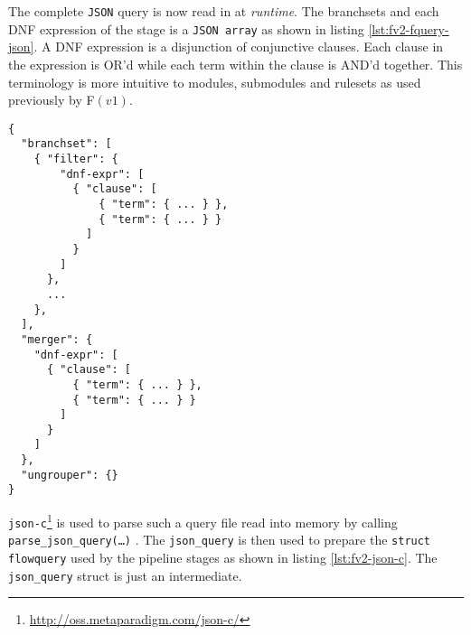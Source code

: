 The complete \texttt{JSON} query is now read in at \emph{runtime}. The
branchsets and each \ac{DNF} expression of the stage is a \texttt{JSON array}
as shown in listing \ref{lst:fv2-fquery-json}. A \ac{DNF} expression is a
disjunction of conjunctive clauses. Each clause in the expression is OR'd
while each term within the clause is AND'd together. This terminology is more
intuitive to modules, submodules and rulesets as used previously by F$(v1)$.

\begin{lstlisting}
{
  "branchset": [
    { "filter": {
        "dnf-expr": [
          { "clause": [
              { "term": { ... } },
              { "term": { ... } }
            ]
          }
        ]
      },
      ...
    },
  ],
  "merger": {
    "dnf-expr": [
      { "clause": [
          { "term": { ... } },
          { "term": { ... } }
        ]
      }
    ]
  },
  "ungrouper": {}
}
\end{lstlisting}

\texttt{json-c}\footnote{\url{http://oss.metaparadigm.com/json-c/}} is used
to parse such a query file read into memory by calling
\texttt{parse\_json\_query(\ldots)} . The
\texttt{json\_query} is then used to prepare the \texttt{struct flowquery}
used by the pipeline stages as shown in listing \ref{lst:fv2-json-c}.  The
\texttt{json\_query} struct is just an intermediate.

